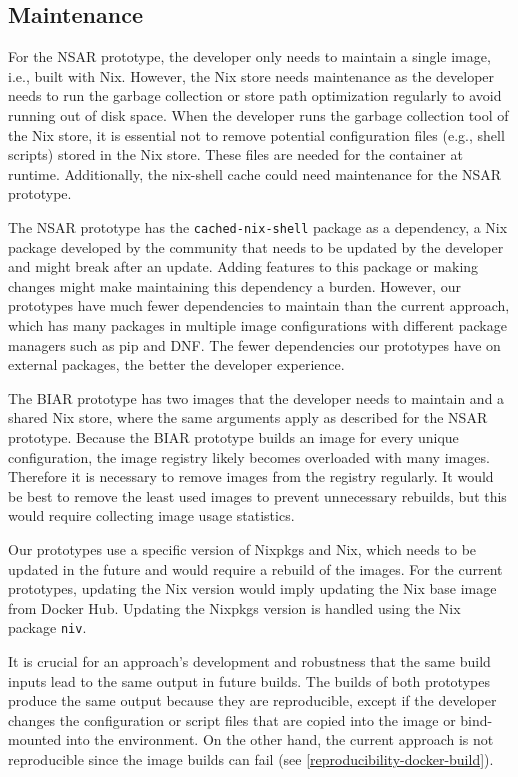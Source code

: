\subsection{Maintenance}
For the NSAR prototype, the developer only needs to maintain a single image, i.e., built with Nix. However, the Nix store needs maintenance as the developer needs to run the garbage collection or store path optimization regularly to avoid running out of disk space. When the developer runs the garbage collection tool of the Nix store, it is essential not to remove potential configuration files (e.g., shell scripts) stored in the Nix store. These files are needed for the container at runtime. Additionally, the nix-shell cache could need maintenance for the NSAR prototype. 

The NSAR prototype has the \verb|cached-nix-shell| package as a dependency, a Nix package developed by the community that needs to be updated by the developer and might break after an update. Adding features to this package or making changes might make maintaining this dependency a burden. However, our prototypes have much fewer dependencies to maintain than the current approach, which has many packages in multiple image configurations with different package managers such as pip and DNF. The fewer dependencies our prototypes have on external packages, the better the developer experience.

The BIAR prototype has two images that the developer needs to maintain and a shared Nix store, where the same arguments apply as described for the NSAR prototype. Because the BIAR prototype builds an image for every unique configuration, the image registry likely becomes overloaded with many images. Therefore it is necessary to remove images from the registry regularly. It would be best to remove the least used images to prevent unnecessary rebuilds, but this would require collecting image usage statistics.

Our prototypes use a specific version of Nixpkgs and Nix, which needs to be updated in the future and would require a rebuild of the images. For the current prototypes, updating the Nix version would imply updating the Nix base image from Docker Hub. Updating the Nixpkgs version is handled using the Nix package \verb|niv|.

It is crucial for an approach's development and robustness that the same build inputs lead to the same output in future builds. The builds of both prototypes produce the same output because they are reproducible, except if the developer changes the configuration or script files that are copied into the image or bind-mounted into the environment. On the other hand, the current approach is not reproducible since the image builds can fail (see \ref{reproducibility-docker-build}). %

